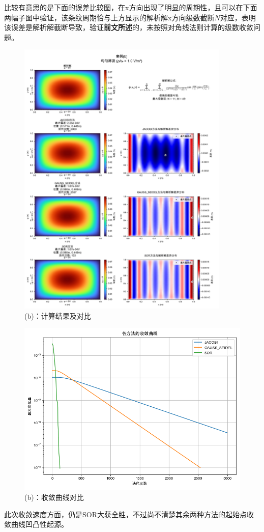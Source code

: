 比较有意思的是下面的误差比较图，在x方向出现了明显的周期性，且可以在下面两幅子图中验证，该条纹周期恰与上方显示的解析解x方向级数截断$N$对应，表明该误差是解析解截断导致，验证\textbf{前文所述}的，未按照对角线法则计算的级数收敛问题。
\begin{figure}[H]
    \centering
    \includegraphics[width=0.9\textwidth]{Problem_1/figs/b_result.png}
    \caption{(b)：计算结果及对比}
\end{figure}

\begin{figure}[H]
    \centering
    \includegraphics[width=1.0\textwidth]{Problem_1/figs/b_convergence.png}
    \caption{(b)：收敛曲线对比}
\end{figure}
此次收敛速度方面，仍是SOR大获全胜，不过尚不清楚其余两种方法的起始点收敛曲线凹凸性起源。
